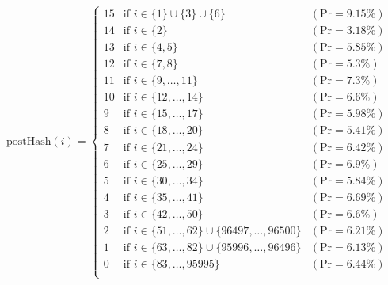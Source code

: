 {\renewcommand{\arraystretch}{1.25}
\[
\text{postHash}(i) = \left\{
    \begin{array}{lll}
        \text{15}  & \text{if } i \in \{1\} \cup \{3\} \cup \{6\} & (\text{Pr} = 9.15\%)
        \\
        \text{14}  & \text{if } i \in \{2\} & (\text{Pr} = 3.18\%)
        \\
        \text{13}  & \text{if } i \in \{4, 5\} & (\text{Pr} = 5.85\%)
        \\
        \text{12}  & \text{if } i \in \{7, 8\} & (\text{Pr} = 5.3\%)
        \\
        \text{11}  & \text{if } i \in \{9, \ldots, 11\} & (\text{Pr} = 7.3\%)
        \\
        \text{10}  & \text{if } i \in \{12, \ldots, 14\} & (\text{Pr} = 6.6\%)
        \\
        \text{9}  & \text{if } i \in \{15, \ldots, 17\} & (\text{Pr} = 5.98\%)
        \\
        \text{8}  & \text{if } i \in \{18, \ldots, 20\} & (\text{Pr} = 5.41\%)
        \\
        \text{7}  & \text{if } i \in \{21, \ldots, 24\} & (\text{Pr} = 6.42\%)
        \\
        \text{6}  & \text{if } i \in \{25, \ldots, 29\} & (\text{Pr} = 6.9\%)
        \\
        \text{5}  & \text{if } i \in \{30, \ldots, 34\} & (\text{Pr} = 5.84\%)
        \\
        \text{4}  & \text{if } i \in \{35, \ldots, 41\} & (\text{Pr} = 6.69\%)
        \\
        \text{3}  & \text{if } i \in \{42, \ldots, 50\} & (\text{Pr} = 6.6\%)
        \\
        \text{2}  & \text{if } i \in \{51, \ldots, 62\} \cup \{96497, \ldots, 96500\} & (\text{Pr} = 6.21\%)
        \\
        \text{1}  & \text{if } i \in \{63, \ldots, 82\} \cup \{95996, \ldots, 96496\} & (\text{Pr} = 6.13\%)
        \\
        \text{0}  & \text{if } i \in \{83, \ldots, 95995\} & (\text{Pr} = 6.44\%)
        \\
    \end{array}
\right.    
\]}




